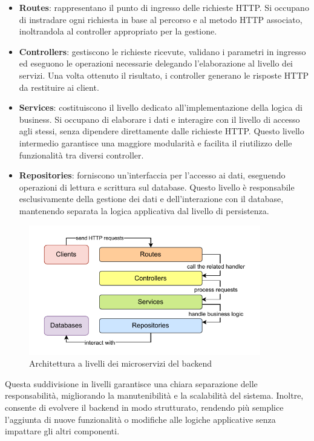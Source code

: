 \begin{itemize}
  \item \textbf{Routes}: rappresentano il punto di ingresso delle richieste HTTP. Si occupano di instradare ogni richiesta in base al percorso e al metodo HTTP associato, inoltrandola al controller appropriato per la gestione.

  \item \textbf{Controllers}: gestiscono le richieste ricevute, validano i parametri in ingresso ed eseguono le operazioni necessarie delegando l’elaborazione al livello dei servizi. Una volta ottenuto il risultato, i controller generano le risposte HTTP da restituire ai client.

  \item \textbf{Services}: costituiscono il livello dedicato all'implementazione della logica di business. Si occupano di elaborare i dati e interagire con il livello di accesso agli stessi, senza dipendere direttamente dalle richieste HTTP. Questo livello intermedio garantisce una maggiore modularità e facilita il riutilizzo delle funzionalità tra diversi controller.

  \item \textbf{Repositories}: forniscono un’interfaccia per l’accesso ai dati, eseguendo operazioni di lettura e scrittura sul database. Questo livello è responsabile esclusivamente della gestione dei dati e dell'interazione con il database, mantenendo separata la logica applicativa dal livello di persistenza.
\end{itemize}

\begin{figure}
  \centering
  \includegraphics[width=0.9\textwidth]{figures/microservice-architecture.pdf}
  \caption{Architettura a livelli dei microservizi del backend}
  \label{fig:microservice-architecture}
\end{figure}

Questa suddivisione in livelli garantisce una chiara separazione delle responsabilità, migliorando la manutenibilità e la scalabilità del sistema. Inoltre, consente di evolvere il backend in modo strutturato, rendendo più semplice l'aggiunta di nuove funzionalità o modifiche alle logiche applicative senza impattare gli altri componenti.
